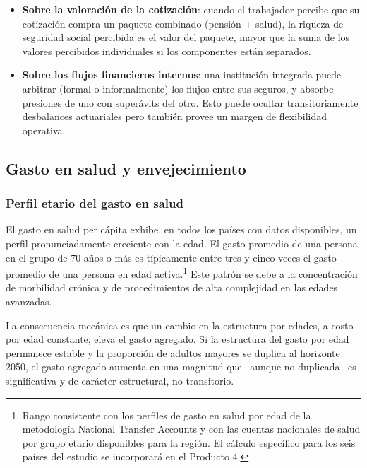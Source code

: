 \documentclass[12pt, letterpaper]{article}
\begin{document}
\begin{itemize}
  \item \textbf{Sobre la valoración de la cotización}: cuando el trabajador percibe
        que su cotización compra un paquete combinado (pensión + salud), la
        riqueza de seguridad social percibida es el valor del paquete, mayor que
        la suma de los valores percibidos individuales si los componentes están
        separados.
  \item \textbf{Sobre los flujos financieros internos}: una institución integrada
        puede arbitrar (formal o informalmente) los flujos entre sus seguros, y
        absorbe presiones de uno con superávits del otro. Esto puede
        ocultar transitoriamente desbalances actuariales pero también provee un
        margen de flexibilidad operativa.
\end{itemize}

\subsection{Gasto en salud y envejecimiento}
\label{sec:salud-envejecimiento}

\subsubsection{Perfil etario del gasto en salud}

El gasto en salud per cápita exhibe, en todos los países con datos disponibles, un
perfil pronunciadamente creciente con la edad. El gasto promedio de una persona en
el grupo de 70 años o más es típicamente entre tres y cinco veces el gasto promedio
de una persona en edad activa.\footnote{Rango consistente con los perfiles de gasto
en salud por edad de la metodología National Transfer Accounts y con las cuentas
nacionales de salud por grupo etario disponibles para la región. El cálculo
específico para los seis países del estudio se incorporará en el Producto 4.} Este
patrón se debe a la concentración de morbilidad crónica y de procedimientos de alta
complejidad en las edades avanzadas.

La consecuencia mecánica es que un cambio en la estructura por edades, a costo por
edad constante, eleva el gasto agregado. Si la estructura del gasto
por edad permanece estable y la proporción de adultos mayores se duplica al
horizonte 2050, el gasto agregado aumenta en una magnitud que --aunque no
duplicada-- es significativa y de carácter estructural, no transitorio.
\end{document}
